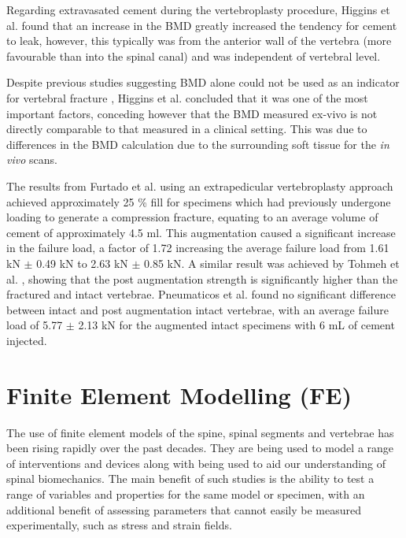 Regarding extravasated cement during the vertebroplasty procedure,
Higgins et al. \cite{Higgins2007a} found that an increase in the BMD greatly
increased the tendency for cement to leak, however, this typically was from
the anterior wall of the vertebra (more favourable than into the spinal canal) and was independent of vertebral
level.

Despite previous studies suggesting BMD alone could not be used as an
indicator for vertebral fracture \cite{Aaron2000}, Higgins et al. concluded
that
it was one of the most important factors, conceding however that the BMD
measured ex-vivo is not directly comparable to that measured in a
clinical setting. This was due to differences in the BMD calculation due to the surrounding soft tissue for the \textit{in vivo} scans.

The results from Furtado et al. \cite{furtado2007biomechanical} using an
extrapedicular
vertebroplasty approach achieved approximately 25 \% fill for specimens
which had previously undergone loading to generate a compression
fracture, equating to an average volume of cement of approximately 4.5 ml.
This
augmentation caused a significant increase in the failure load, a factor
of 1.72 increasing the average failure load from 1.61 kN $\pm$ 0.49 kN to
2.63 kN $\pm$ 0.85 kN. A similar result was achieved by Tohmeh et al.
\cite{tohmeh1999biomechanical}, showing that the post augmentation strength is
significantly
higher than the fractured and intact vertebrae. Pneumaticos et al.
\cite{pneumaticos2013effect} found no significant difference between intact and
post
augmentation intact vertebrae, with an average failure load of 5.77 $\pm$
2.13 kN for the augmented intact specimens with 6 mL of cement
injected.

%

\section{Finite Element Modelling
(FE)}\label{finite-element-modelling-fe}

The use of finite element models of the spine, spinal segments and
vertebrae has been rising rapidly over the past decades. They are being
used to model a range of interventions and devices along with being used
to aid our understanding of spinal biomechanics. The main benefit of
such studies is the ability to test a range of variables and properties
for the same model or specimen, with an additional benefit of assessing
parameters that cannot easily be measured experimentally, such as stress and
strain fields.

